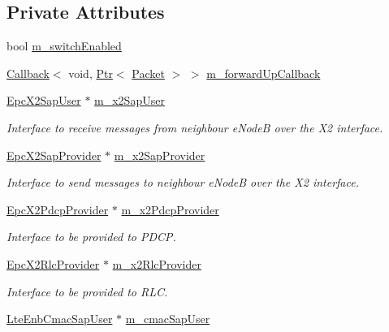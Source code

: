 \subsection*{Private Attributes}
\begin{DoxyCompactItemize}
\item 
bool \hyperlink{classns3_1_1LteEnbRrc_a1d1c4218f9e1c0b4b3e2605949138f06}{m\+\_\+switch\+Enabled}
\item 
\hyperlink{classns3_1_1Callback}{Callback}$<$ void, \hyperlink{classns3_1_1Ptr}{Ptr}$<$ \hyperlink{classns3_1_1Packet}{Packet} $>$ $>$ \hyperlink{classns3_1_1LteEnbRrc_a238ba239786f43929e61cc0781b7ecd4}{m\+\_\+forward\+Up\+Callback}
\item 
\hyperlink{classns3_1_1EpcX2SapUser}{Epc\+X2\+Sap\+User} $\ast$ \hyperlink{classns3_1_1LteEnbRrc_abe194d716748f1d4579731c60cd8022c}{m\+\_\+x2\+Sap\+User}
\begin{DoxyCompactList}\small\item\em Interface to receive messages from neighbour e\+NodeB over the X2 interface. \end{DoxyCompactList}\item 
\hyperlink{classns3_1_1EpcX2SapProvider}{Epc\+X2\+Sap\+Provider} $\ast$ \hyperlink{classns3_1_1LteEnbRrc_ae8dc75f4f6f63b7736d86204a4beb415}{m\+\_\+x2\+Sap\+Provider}
\begin{DoxyCompactList}\small\item\em Interface to send messages to neighbour e\+NodeB over the X2 interface. \end{DoxyCompactList}\item 
\hyperlink{classns3_1_1EpcX2PdcpProvider}{Epc\+X2\+Pdcp\+Provider} $\ast$ \hyperlink{classns3_1_1LteEnbRrc_ac47629b25790f99556dda5cbe67bf38a}{m\+\_\+x2\+Pdcp\+Provider}
\begin{DoxyCompactList}\small\item\em Interface to be provided to P\+D\+CP. \end{DoxyCompactList}\item 
\hyperlink{classns3_1_1EpcX2RlcProvider}{Epc\+X2\+Rlc\+Provider} $\ast$ \hyperlink{classns3_1_1LteEnbRrc_a12b5a146b24eee21ce4df43dd6512114}{m\+\_\+x2\+Rlc\+Provider}
\begin{DoxyCompactList}\small\item\em Interface to be provided to R\+LC. \end{DoxyCompactList}\item 
\hyperlink{classns3_1_1LteEnbCmacSapUser}{Lte\+Enb\+Cmac\+Sap\+User} $\ast$ \hyperlink{classns3_1_1LteEnbRrc_a0774c35dec69a3c8576b19b7f46d475b}{m\+\_\+cmac\+Sap\+User}

\end{DoxyCompactItemize}
